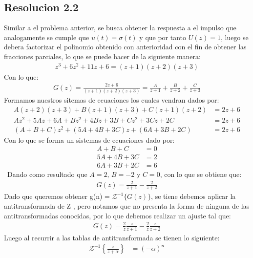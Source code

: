 \documentclass[
  11pt,
  letterpaper,
   addpoints,
   answers
  ]{exam}
\begin{document}
\begin{questions}
\begin{solution}
        \subsection*{Resolucion 2.2}
        Similar a el problema anterior, se busca obtener la respuesta a el impulso que analogamente se cumple que $u(t)= \sigma(t)$ y que por tanto $U(z)=1$, luego se debera factorizar el polinomio obtenido con anterioridad con el fin de obtener las fracciones parciales, lo que se puede hacer de la siguiente manera:
        \begin{align}
            z^{3} + 6z^{2}+11z+6 = (z+1)(z+2)(z+3)
        \end{align}
        Con lo que:
        \begin{align}
            G(z) = \frac{2z+6}{(z+1)(z+2)(z+3)} = \frac{A}{z+1} + \frac{B}{z+2} + \frac{C}{z+3}
        \end{align}
        Formamos nuestros sitemas de ecuaciones los cuales vendran dados por:
        \begin{align}
            A(z+2)(z+3) + B(z+1)(z+3) + C(z+1)(z+2) &= 2z+6\\
            Az^{2} + 5Az + 6A + Bz^{2} + 4Bz + 3B + Cz^{2} + 3Cz + 2C &= 2z+6\\
            (A+B+C)z^{2} + (5A+4B+3C)z + (6A+3B+2C) &= 2z+6
        \end{align}
        Con lo que se forma un sistemas de ecuaciones dado por:
        \begin{align}
            A+B+C &= 0\\
            5A+4B+3C &= 2\\
            6A+3B+2C &= 6
        \end{align}\
        Dando como resultado que $A=2$, $B=-2$ y $C=0$, con lo que se obtiene que:
        \begin{align}
            G(z) = \frac{2}{z+1} - \frac{2}{z+2}
        \end{align}
        Dado que queremos obtener g(n) = $\mathcal{Z}^{-1}\{G(z)\}$, se tiene debemos aplicar la antitransformada de Z , pero notamos que no presenta la forma de ninguna de las antitransformadas conocidas, por lo que debemos realizar un ajuste tal que:
        \begin{align}
            G(z) = \frac{2}{z}\frac{z}{z+1} - \frac{2}{z}\frac{z}{z+2}
        \end{align}
        Luego al recurrir a las tablas de antitransformada se tienen lo siguiente:
        \begin{align}
            \mathcal{Z}^{-1} \left\{ \frac{z}{z+\alpha} \right\} &= (-\alpha)^{n}\\

\end{align}
\end{solution}
\end{questions}
\end{document}
